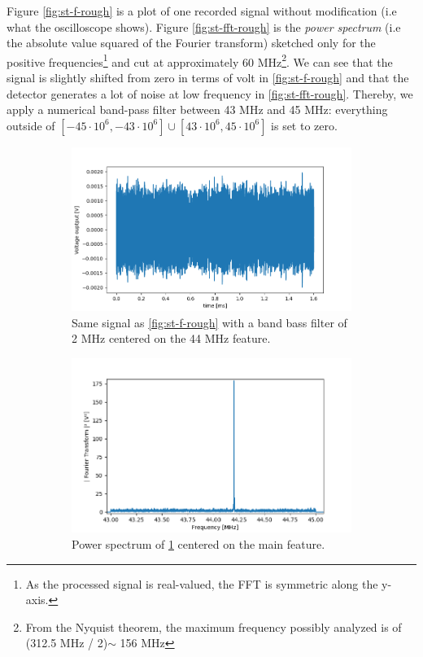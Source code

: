 \documentclass[11pt]{report}
\begin{document}
Figure \ref{fig:st-f-rough} is a plot of one recorded signal without modification (i.e what the oscilloscope shows). Figure \ref{fig:st-fft-rough} is the \textit{power spectrum} (i.e the absolute value squared of the Fourier transform) sketched only for the positive frequencies\footnote{As the processed signal is real-valued, the FFT is symmetric along the y-axis.} and cut at approximately 60 MHz\footnote{From the Nyquist theorem, the maximum frequency possibly analyzed is of (312.5 MHz / 2)$\sim$ 156 MHz}. We can see that the signal is slightly shifted from zero in terms of volt in \ref{fig:st-f-rough} and that the detector generates a lot of noise at low frequency in \ref{fig:st-fft-rough}. Thereby, we apply a numerical band-pass filter between 43 MHz and 45 MHz: everything outside of $\left[-45\cdot 10^6, -43\cdot 10^6 \right] \cup \left[43\cdot 10^6, 45\cdot 10^6 \right]$ is set to zero.

\begin{figure}[h!]
\centering
\begin{subfigure}{.48\textwidth}
  \centering
  \includegraphics[width=1.1\linewidth]{st-f-bpf}
  \caption{Same signal as \ref{fig:st-f-rough} with a band bass filter of 2 MHz centered on the 44 MHz feature.}
  \label{fig:st-f-bpf}
\end{subfigure}%
\hspace{1em}%
\begin{subfigure}{.48\textwidth}
  \centering
  \includegraphics[width=1.1\linewidth]{st-fft-bpf}
  \caption{Power spectrum of \ref{fig:st-f-bpf} centered on the main feature.}
  \label{fig:st-fft-bpf}
\end{subfigure}
\caption{}
\end{figure}
\end{document}
